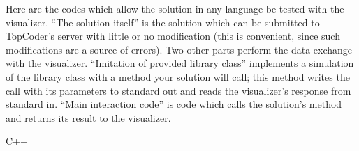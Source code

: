 Here are the codes which allow the solution in any language be tested
with the visualizer. ``The solution itself'' is the solution which can
be submitted to TopCoder's server with little or no modification (this
is convenient, since such modifications are a source of errors). Two
other parts perform the data exchange with the visualizer. ``Imitation
of provided library class'' implements a simulation of the library class
with a method your solution will call; this method writes the call with
its parameters to standard out and reads the visualizer's response from
standard in. ``Main interaction code'' is code which calls the
solution's method and returns its result to the visualizer.

C++

\begin{Shaded}
\begin{Highlighting}[]



 


   \NormalTok{:}

    






\NormalTok{   \}}

\NormalTok{\};}




 


   \NormalTok{:}


\end{Highlighting}
\end{Shaded}
